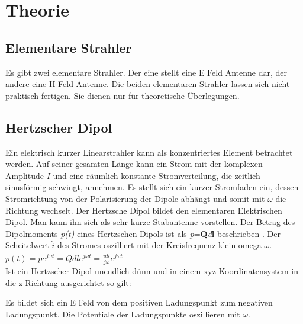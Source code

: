 \newpage
\section{Theorie}
\subsection{Elementare Strahler}
Es gibt zwei elementare Strahler. Der eine stellt eine E Feld Antenne dar, der andere eine H Feld Antenne. Die beiden elementaren Strahler lassen sich nicht praktisch fertigen. Sie dienen nur für theoretische Überlegungen. 
\subsection{Hertzscher Dipol }
Ein elektrisch kurzer Linearstrahler kann als konzentriertes Element betrachtet werden. Auf seiner gesamten Länge kann ein Strom mit der komplexen Amplitude $I$ und eine räumlich konstante Stromverteilung, die zeitlich sinusförmig schwingt, annehmen. Es stellt sich ein kurzer Stromfaden ein, dessen Stromrichtung von der Polarisierung der Dipole abhängt und somit mit $\omega $ die Richtung wechselt. 
Der Hertzsche Dipol bildet den elementaren Elektrischen Dipol. Man kann ihn sich als sehr kurze Stabantenne vorstellen. Der Betrag des Dipolmoments \textit{p(t)} eines Hertzschen Dipols ist als \textit{p}=\textbf{Q}\textit{d}\textbf{\textbf{l}} beschrieben \cite{Emant}. Der Scheitelwert $\hat{i}$ des Stromes  oszilliert mit der Kreisfrequenz klein omega $\omega$.\\
$p(t)=pe^{j\omega t} = Q dl e^{j\omega t} = \frac{\hat{i} dl}{j\omega }e^{j\omega t}  $
\\
Ist ein Hertzscher Dipol unendlich dünn und in einem xyz Koordinatensystem in die z Richtung ausgerichtet so gilt:
 
Es bildet sich ein E Feld von dem positiven Ladungspunkt zum negativen Ladungspunkt. Die Potentiale der Ladungspunkte oszillieren mit $\omega$. 

